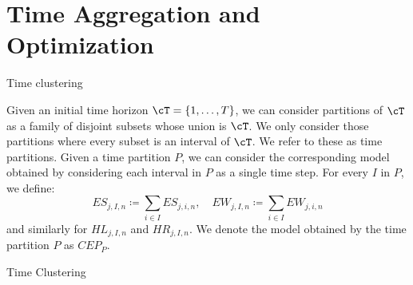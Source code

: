 
\section{Time Aggregation and Optimization}


\begin{frame}{Time clustering}


  Given an initial time horizon \(\cT = \{1, \ldots, T\}\), we can consider partitions of \(\cT\) as a family of disjoint subsets whose union is \(\cT\). We only consider those partitions where every subset is an interval of \(\cT\). We refer to these as time partitions. Given a time partition \(P\), we can consider the corresponding model obtained by considering each interval in \(P\) as a single time step. For every \(I\) in \(P\), we define:
  \[
  ES_{j,I,n} \coloneqq \sum_{i \in I} ES_{j,i,n}, \quad EW_{j,I,n} \coloneqq \sum_{i \in I} EW_{j,i,n}
  \]
  and similarly for \(HL_{j,I,n}\) and \(HR_{j,I,n}\). We denote the model obtained by the time partition \(P\) as \(CEP_P\).
\end{frame}

\begin{frame}{Time Clustering}

\end{frame}